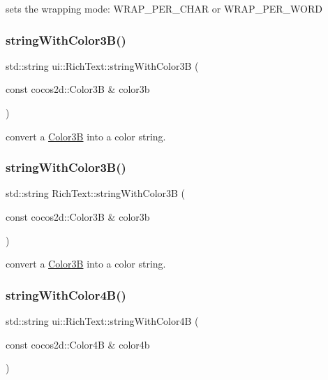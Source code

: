 sets the wrapping mode\+: W\+R\+A\+P\+\_\+\+P\+E\+R\+\_\+\+C\+H\+AR or W\+R\+A\+P\+\_\+\+P\+E\+R\+\_\+\+W\+O\+RD \mbox{\label{classui_1_1RichText_ab923374d5a30f539696c9a4f887b4307}} 
\subsubsection{\texorpdfstring{string\+With\+Color3\+B()}{stringWithColor3B()}\hspace{0.1cm}{\footnotesize\ttfamily [1/2]}}
{\footnotesize\ttfamily std\+::string ui\+::\+Rich\+Text\+::string\+With\+Color3B (\begin{DoxyParamCaption}\item[{const cocos2d\+::\+Color3B \&}]{color3b }\end{DoxyParamCaption})}

convert a \hyperlink{structColor3B}{Color3B} into a color string. \mbox{\label{classui_1_1RichText_ac81e46b4a4d36f7c607803fc125721e6}} 
\subsubsection{\texorpdfstring{string\+With\+Color3\+B()}{stringWithColor3B()}\hspace{0.1cm}{\footnotesize\ttfamily [2/2]}}
{\footnotesize\ttfamily std\+::string Rich\+Text\+::string\+With\+Color3B (\begin{DoxyParamCaption}\item[{const cocos2d\+::\+Color3B \&}]{color3b }\end{DoxyParamCaption})}

convert a \hyperlink{structColor3B}{Color3B} into a color string. \mbox{\label{classui_1_1RichText_a82ba2d0b27f544d8f729cf18a32d3bad}} 
\subsubsection{\texorpdfstring{string\+With\+Color4\+B()}{stringWithColor4B()}\hspace{0.1cm}{\footnotesize\ttfamily [1/2]}}
{\footnotesize\ttfamily std\+::string ui\+::\+Rich\+Text\+::string\+With\+Color4B (\begin{DoxyParamCaption}\item[{const cocos2d\+::\+Color4B \&}]{color4b }\end{DoxyParamCaption})}

